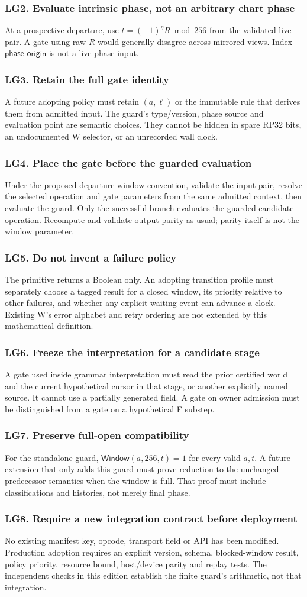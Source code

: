 \documentclass[11pt,a4paper]{article}
\newcommand{\req}[2]{\subsubsection{#1. #2}}
\theoremstyle{lpstyle}
\newcommand{\sbit}[1]{(-1)^{#1}}
\begin{document}
\req{LG2}{Evaluate intrinsic phase, not an arbitrary chart phase}
At a prospective departure, use $t=\sbit{\eta}R\bmod256$ from the validated live pair. A gate using raw $R$ would generally disagree across mirrored views. Index $\mathsf{phase\_origin}$ is not a live phase input.

\req{LG3}{Retain the full gate identity}
A future adopting policy must retain $(a,\ell)$ or the immutable rule that derives them from admitted input. The guard's type/version, phase source and evaluation point are semantic choices. They cannot be hidden in spare RP32 bits, an undocumented W selector, or an unrecorded wall clock.

\req{LG4}{Place the gate before the guarded evaluation}
Under the proposed departure-window convention, validate the input pair, resolve the selected operation and gate parameters from the same admitted context, then evaluate the guard. Only the successful branch evaluates the guarded candidate operation. Recompute and validate output parity as usual; parity itself is not the window parameter.

\req{LG5}{Do not invent a failure policy}
The primitive returns a Boolean only. An adopting transition profile must separately choose a tagged result for a closed window, its priority relative to other failures, and whether any explicit waiting event can advance a clock. Existing W's error alphabet and retry ordering are not extended by this mathematical definition.

\req{LG6}{Freeze the interpretation for a candidate stage}
A gate used inside grammar interpretation must read the prior certified world and the current hypothetical cursor in that stage, or another explicitly named source. It cannot use a partially generated field. A gate on owner admission must be distinguished from a gate on a hypothetical F substep.

\req{LG7}{Preserve full-open compatibility}
For the standalone guard, $\mathsf{Window}(a,256,t)=1$ for every valid $a,t$. A future extension that only adds this guard must prove reduction to the unchanged predecessor semantics when the window is full. That proof must include classifications and histories, not merely final phase.

\req{LG8}{Require a new integration contract before deployment}
No existing manifest key, opcode, transport field or API has been modified. Production adoption requires an explicit version, schema, blocked-window result, policy priority, resource bound, host/device parity and replay tests. The independent checks in this edition establish the finite guard's arithmetic, not that integration.
\end{document}
